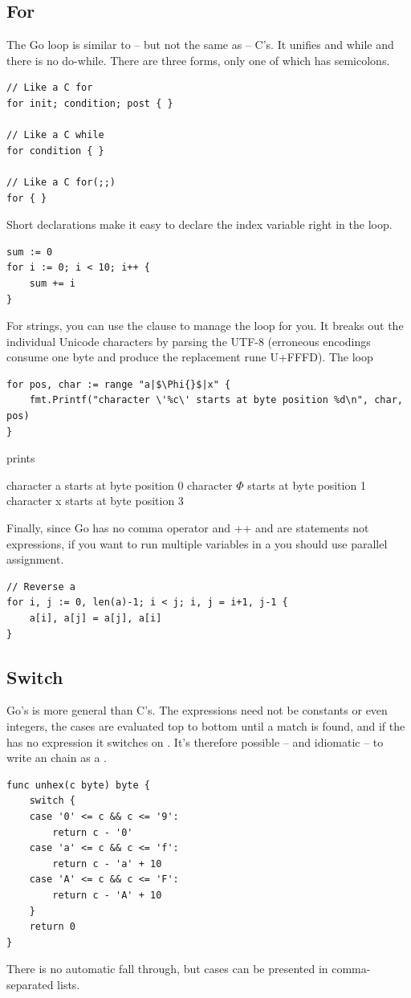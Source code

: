 \subsection{For}
The Go  loop is similar to -- but not the same as -- C's. It
unifies 
and while and there is no do-while. There are three forms, only one of
which has semicolons.
\begin{lstlisting}
// Like a C for
for init; condition; post { }

// Like a C while
for condition { }

// Like a C for(;;)
for { }
\end{lstlisting}
Short declarations make it easy to declare the index variable right in the loop.
\begin{lstlisting}
sum := 0
for i := 0; i < 10; i++ {
    sum += i
}
\end{lstlisting}
For strings, you can use the  clause to manage the loop for
you. It breaks out the individual Unicode characters by parsing the UTF-8 (erroneous encodings consume one
byte and produce the replacement rune U+FFFD). The loop

\begin{lstlisting}
for pos, char := range "a|$\Phi{}$|x" {
    fmt.Printf("character \'%c\' starts at byte position %d\n", char, pos)
}
\end{lstlisting}
prints
\begin{display}
character a starts at byte position 0
character \begin{math}\Phi\end{math} starts at byte position 1
character x starts at byte position 3
\end{display}
Finally, since Go has no comma operator and ++ and \-\- are statements not
expressions, if you want to run multiple variables in a  you should
use parallel assignment.
\begin{lstlisting}
// Reverse a
for i, j := 0, len(a)-1; i < j; i, j = i+1, j-1 {
    a[i], a[j] = a[j], a[i]
}
\end{lstlisting}

\subsection{Switch}
Go's  is more general than C's. The expressions need not be
constants or even integers, the cases are evaluated top to bottom until
a match is found, and if the  has no expression it switches on
. It's therefore possible -- and idiomatic -- to write an
 chain as a .
\begin{lstlisting}
func unhex(c byte) byte {
    switch {
    case '0' <= c && c <= '9':
        return c - '0'
    case 'a' <= c && c <= 'f':
        return c - 'a' + 10
    case 'A' <= c && c <= 'F':
        return c - 'A' + 10
    }
    return 0
}
\end{lstlisting}
There is no automatic fall through, but cases can be presented in comma-separated lists.

